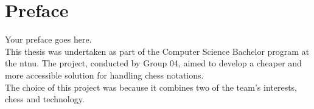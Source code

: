 \chapter*{Preface}
Your preface goes here.\\

This thesis was undertaken as part of the Computer Science Bachelor program at the \gls{ntnu}. The project, conducted by Group 04, aimed to develop a cheaper and more accessible solution for handling chess notations. \\

The choice of this project was because it combines two of the team's interests, chess and technology.
